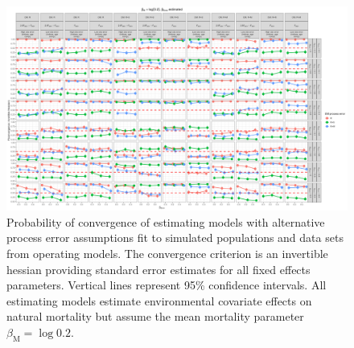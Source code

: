 \documentclass[
  12pt,
]{article}
\begin{document}
\begin{landscape}
\begin{figure}
\caption{Probability of convergence of estimating models with alternative process error assumptions fit to simulated populations and data sets from operating models. The convergence criterion is an invertible hessian providing standard error estimates for all fixed effects parameters. Vertical lines represent 95\% confidence intervals. All estimating models estimate environmental covariate effects on natural mortality but assume the mean mortality parameter $\beta_\text{M} = \log 0.2$.}\label{convergence_M_fixed}
\begin{center}
\includegraphics[height = \textheight]{proportion_good_hessian_ecov_effect_est_M_fixed.png}
\end{center}
\end{figure}
\end{landscape}
\end{document}
